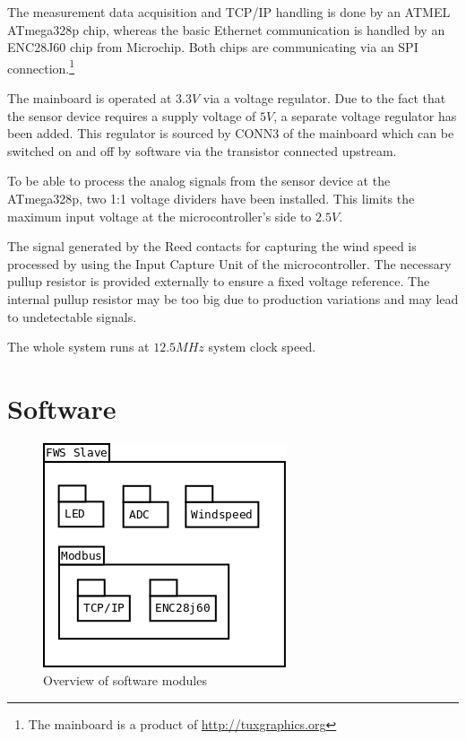 The measurement data acquisition and TCP/IP handling is done by an ATMEL ATmega328p chip, whereas the basic Ethernet communication is handled by an ENC28J60 chip from Microchip. Both chips are communicating via an SPI connection.\footnote{The mainboard is a product of \url{http://tuxgraphics.org}} 

The mainboard is operated at $3.3 V$ via a voltage regulator. Due to the fact that the sensor device requires a supply voltage of $5 V$, a separate voltage regulator has been added. This regulator is sourced by CONN3 of the mainboard which can be switched on and off by software via the transistor connected upstream.

To be able to process the analog signals from the sensor device at the ATmega328p, two 1:1 voltage dividers have been installed. This limits the maximum input voltage at the microcontroller's side to $2.5 V$.

The signal generated by the Reed contacts for capturing the wind speed is processed by using the Input Capture Unit of the microcontroller. The necessary pullup resistor is provided externally to ensure a fixed voltage reference. The internal pullup resistor may be too big due to production variations and may lead to undetectable signals.

The whole system runs at $12.5 MHz$ system clock speed.

\section{Software}

\begin{figure}[H]
    \centering
    \includegraphics[width=0.6\linewidth]{graphics/fws_slave.png}
    \caption{Overview of software modules}
    \label{fig:slave_software}
\end{figure}


